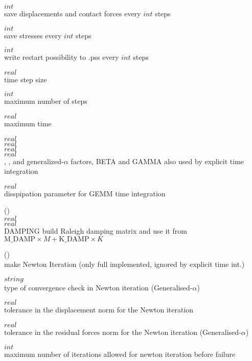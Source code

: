  $int$\\
save displacements and contact forces every $int$ steps

 $int$\\
save stresses every $int$ steps

 $int$\\
write restart possibility to .pss every $int$ steps

 $real$\\
time step size

 $int$\\
maximum number of steps

 $real$\\
maximum time

 $real$\\
 $real$\\
 $real$\\
 $real$\\
, ,  and  generalized-$\alpha$
factors, BETA and GAMMA also 
used by explicit time integration



 $real$\\
disspipation parameter for GEMM time integration

 (\kor{})\\
 $real$\\
 $real$\\
DAMPING build Raleigh damping matrix and use it from $\text{M\_DAMP}
\times M + \text{K\_DAMP} \times K$

 (\kor{}\kor{})\\
make Newton Iteration (only full implemented, ignored by explicit
time int.)

 $string$\\
type of convergence check in Newton iteration (Generalised-$\alpha$)

 $real$\\
tolerance in the displacement norm for the Newton iteration 

 $real$\\
tolerance in the residual forces norm for the Newton iteration (Generalised-$\alpha$)

 $int$\\
maximum number of iterations allowed for newton iteration before failure

